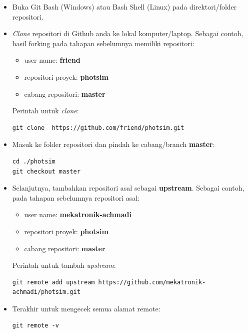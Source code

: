 \documentclass[12pt]{article}
\begin{document}
	\begin{itemize}
		\item Buka Git Bash (Windows) atau Bash Shell (Linux) pada direktori/folder repositori.
		\item \textit{Clone} repositori di Github anda ke lokal komputer/laptop.
		Sebagai contoh, hasil forking pada tahapan sebelumnya memiliki repositori:
		\begin{itemize}
			\item user name: \textbf{friend}
			\item repositori proyek: \textbf{photsim}
			\item cabang repositori: \textbf{master}
		\end{itemize}
	
		Perintah untuk \textit{clone}:
		\begin{verbatim}
git clone  https://github.com/friend/photsim.git
		\end{verbatim}
		
		\item Masuk ke folder repositori dan pindah ke cabang/branch \textbf{master}:
		\begin{verbatim}
cd ./photsim
git checkout master
		\end{verbatim}
		
		\item Selanjutnya, tambahkan repositori asal sebagai \textbf{upstream}.
		Sebagai contoh, pada tahapan sebelumnya repositori asal: 
		\begin{itemize}
			\item user name: \textbf{mekatronik-achmadi}
			\item repositori proyek: \textbf{photsim}
			\item cabang repositori: \textbf{master}
		\end{itemize}
		Perintah untuk tambah \textit{upstream}:
		\begin{verbatim}
git remote add upstream https://github.com/mekatronik-achmadi/photsim.git
		\end{verbatim}	
	
		\item Terakhir untuk mengecek semua alamat remote:
		\begin{verbatim}
git remote -v
		\end{verbatim}
	\end{itemize} 
\end{document}

